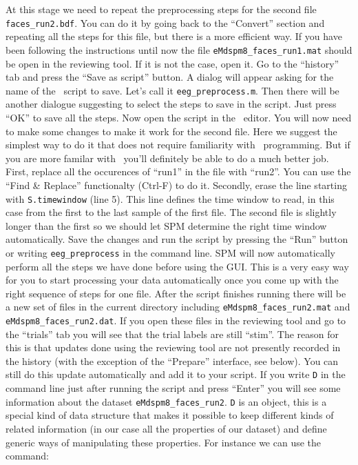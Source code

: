 At this stage we need to repeat the preprocessing steps for the second file \texttt{faces\_run2.bdf}. You can do it by going back to the ``Convert'' section and repeating all the steps for this file, but there is a more efficient way. If you have been following the instructions until now the file \texttt{eMdspm8\_faces\_run1.mat} should be open in the reviewing tool. If it is not the case, open it. Go to the ``history'' tab and press the ``Save as script'' button. A dialog will appear asking for the name of the \matlab\ script to save. Let's call it \texttt{eeg\_preprocess.m}. Then there will be another dialogue suggesting to select the steps to save in the script. Just press ``OK'' to save all the steps. Now open the script in the \matlab\ editor. You will now need to make some changes to make it work for the second file. Here we suggest the simplest way to do it that does not require familiarity with \matlab\ programming. But if you are more familar with \matlab\ you'll definitely be able to do a much better job. First, replace all the occurences of ``run1'' in the file with ``run2''. You can use the ``Find \& Replace'' functionalty (Ctrl-F) to do it. Secondly, erase the line starting with \texttt{S.timewindow} (line 5). This line defines the time window to read, in this case from the first to the last sample of the first file. The second file is slightly longer than the first so we should let SPM determine the right time window automatically. Save the changes and run the script by pressing the ``Run'' button or writing \texttt{eeg\_preprocess} in the command line. SPM will now automatically perform all the steps we have done before using the GUI. This is a very easy way for you to start processing your data automatically once you come up with the right sequence of steps for one file. After the script finishes running there will be a new set of files in the current directory including \texttt{eMdspm8\_faces\_run2.mat} and \texttt{eMdspm8\_faces\_run2.dat}. If you open these files in the reviewing tool and go to the ``trials'' tab you will see that the trial labels are still ``stim''. The reason for this is that updates done using the reviewing tool are not presently recorded in the history (with the exception of the ``Prepare'' interface, see below). You can still do this update automatically and add it to your script. If you write \texttt{D} in the command line just after running the script and press ``Enter'' you will see some information about the dataset \texttt{eMdspm8\_faces\_run2}. \texttt{D} is an object, this is a special kind of data structure that makes it possible to keep different kinds of related information (in our case all the properties of our dataset) and define generic ways of manipulating these properties. For instance we can use the command:
